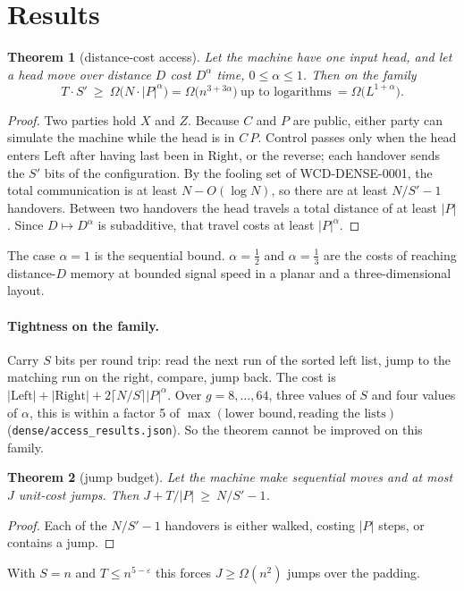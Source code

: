 \documentclass[11pt]{article}
\newtheorem{theorem}{Theorem}
\begin{document}
\section{Results}
\begin{theorem}[distance-cost access]\label{thm:dist}
Let the machine have one input head, and let a head move over distance $D$ cost $D^{\alpha}$ time, $0\le\alpha\le1$. Then on the family
\[T\cdot S'\ \ge\ \Omega\bigl(N\cdot|P|^{\alpha}\bigr)=\Omega\bigl(n^{3+3\alpha}\bigr)\ \text{up to logarithms}\ =\Omega\bigl(L^{1+\alpha}\bigr).\]
\end{theorem}
\begin{proof}
Two parties hold $X$ and $Z$. Because $C$ and $P$ are public, either party can simulate the machine while the head is in $C\,P$. Control passes only when the head enters $\mathrm{Left}$ after having last been in $\mathrm{Right}$, or the reverse; each handover sends the $S'$ bits of the configuration. By the fooling set of WCD-DENSE-0001, the total communication is at least $N-O(\log N)$, so there are at least $N/S'-1$ handovers. Between two handovers the head travels a total distance of at least $|P|$. Since $D\mapsto D^{\alpha}$ is subadditive, that travel costs at least $|P|^{\alpha}$.
\end{proof}
The case $\alpha=1$ is the sequential bound. $\alpha=\tfrac12$ and $\alpha=\tfrac13$ are the costs of reaching distance-$D$ memory at bounded signal speed in a planar and a three-dimensional layout.

\paragraph{Tightness on the family.} Carry $S$ bits per round trip: read the next run of the sorted left list, jump to the matching run on the right, compare, jump back. The cost is $|\mathrm{Left}|+|\mathrm{Right}|+2\lceil N/S\rceil|P|^{\alpha}$. Over $g=8,\dots,64$, three values of $S$ and four values of $\alpha$, this is within a factor 5 of $\max(\text{lower bound},\text{reading the lists})$ (\texttt{dense/access\_results.json}). So the theorem cannot be improved on this family.

\begin{theorem}[jump budget]\label{thm:jump}
Let the machine make sequential moves and at most $J$ unit-cost jumps. Then $J+T/|P|\ \ge\ N/S'-1$.
\end{theorem}
\begin{proof}
Each of the $N/S'-1$ handovers is either walked, costing $|P|$ steps, or contains a jump.
\end{proof}
With $S=n$ and $T\le n^{5-\varepsilon}$ this forces $J\ge\Omega(n^{2})$ jumps over the padding.
\end{document}
